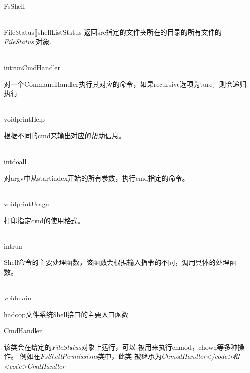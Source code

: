 \begin{XeClass}{FsShell}
\begin{XeMethod}{\XePrivate\\ }{FileStatus[]}{shellListStatus}
 返回src指定的文件夹所在的目录的所有文件的\emph{FileStatus}
 对象.

  \end{XeMethod}

  \begin{XeMethod}{\XePrivate\\ }{int}{runCmdHandler}
       
 对一个CommandHandler执行其对应的命令，如果recursive选项为ture，则会递归执行

  \end{XeMethod}

  \begin{XeMethod}{\XePrivate\\ }{void}{printHelp}
       
 根据不同的cmd来输出对应的帮助信息。

  \end{XeMethod}

  \begin{XeMethod}{\XePrivate\\ }{int}{doall}
       
 对argv中从startindex开始的所有参数，执行cmd指定的命令。

  \end{XeMethod}

  \begin{XeMethod}{\XePrivate\\ }{void}{printUsage}
       
 打印指定cmd的使用格式。

  \end{XeMethod}

  \begin{XeMethod}{\XePublic\\ }{int}{run}
       
 Shell命令的主要处理函数，该函数会根据输入指令的不同，调用具体的处理函数。

  \end{XeMethod}

  \begin{XeMethod}{\XePublic\\ }{void}{main}
       
 hadoop文件系统Shell接口的主要入口函数

  \end{XeMethod}

  \begin{XeInnerClass}{CmdHandler}
     
 该类会在给定的\emph{FileStatus}对象上运行，可以
 被用来执行chmod，chown等多种操作。
 例如在\emph{FsShellPermissions}类中，此类
 被继承为\emph{ChmodHandler</code>和<code>CmdHandler}


\end{XeInnerClass}
\end{XeClass}
